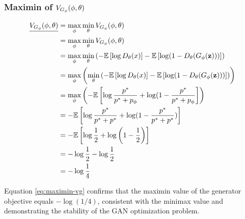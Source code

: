\subsubsection{Maximin of $V_{G_\phi}(\phi, \theta)$}
\label{sec:maximin-vg}
\begin{align}
  \underline{V_{G_\phi}(\phi, \theta)} & = \max_{\mathbf{\phi}} \min_{\mathbf{\theta}}V_{G_\phi}(\phi, \theta) \nonumber \\
                   & = \max_{\mathbf{\phi}}\min_{\mathbf{\theta}}V_{G_\phi}(\phi, \theta) \nonumber \\
                   & = \max_{\phi}\min_{\theta} \left(
                     -\mathbb{E}\left[\log{D_\theta(x)}\right] -
                     \mathbb{E}\left[\log(1 -
                     D_\theta(G_\phi(\mathbf{z})))\right] \right) \nonumber \\
                   & = \max_{\phi}\left(\min_{\theta} \left(
                     -\mathbb{E}\left[\log{D_\theta(x)}\right] -
                     \mathbb{E}\left[\log(1 -
                     D_\theta(G_\phi(\mathbf{z})))\right] \right)
                     \right) \nonumber \\
                   & = \max_{\phi}\left(
                     -\mathbb{E}\left[\log{p^*\over p^*+ p_{\phi}} +
                     \log(1 -
                     {p^* \over p^* + p_{\phi}}\right] \right) \nonumber \\
                   & =
                     -\mathbb{E}\left[\log{p^*\over p^*+ p^*} +
                     \log(1 -
                     {p^* \over p^* + p^*})\right] \nonumber \\
                  & = - \mathbb{E}\left[\log{1 \over 2} +
                    \log{\left(1 - {1 \over 2}\right)}\right] \nonumber \\
                  & = - \log{1 \over 2} - \log{1 \over 2} \nonumber \\
                  & = - \log{1 \over 4} \label{eq:maximin-vg}
\end{align}

Equation \ref{eq:maximin-vg} confirms that the maximin value of the generator objective equals $-\log(1/4)$, consistent with the minimax value and demonstrating the stability of the GAN optimization problem.

